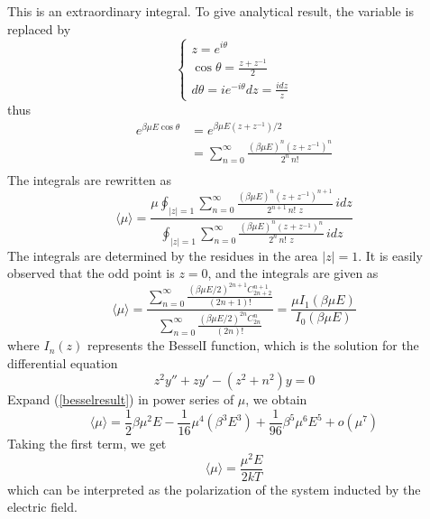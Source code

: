 \documentclass[%
 reprint,
 amsmath,amssymb,
 aps,
10.5pt,
]{revtex4-1}
\begin{document}
 This is an extraordinary integral. To give analytical result, the variable is replaced by
 \begin{equation}
   \begin{cases}
   z = e^{i\theta}\\
   \cos{\theta} = \frac{z+z^{-1}}{2} \\
   d\theta = i e^{-i\theta} dz = \frac{i dz}{z}
   \end{cases}
 \end{equation}
 thus
 \begin{align*}
   e^{\beta \mu E \cos{\theta}} & = e^{\beta \mu E (z + z^{-1})/2} \\
   & = \sum_{n=0}^\infty \frac{(\beta \mu E)^n (z+z^{-1})^{n}}{2^n \, n!} \\
 \end{align*}
 The integrals are rewritten as
 \begin{equation}
   \langle \mu \rangle =  \frac{\mu\oint_{|z|=1} \sum_{n=0}^\infty \frac{( \beta \mu E)^n (z+z^{-1})^{n+1}}{2^{n+1} \, n! \,\, z} \, idz}
   {\oint_{|z|=1} \sum_{n=0}^\infty \frac{( \beta \mu E)^n (z+z^{-1})^{n}}{2^n \, n! \,\, z} \, idz}
 \end{equation}
 The integrals are determined by the residues in the area $|z| = 1$. It is easily observed that the odd point is $z=0$, and the integrals are given as 
 \begin{equation}
   \langle \mu \rangle = \frac{\sum_{n=0}^{\infty} \frac{( \beta \mu E/2)^{2n+1} C_{2n+2}^{n+1}}{(2n+1)!} }{ \sum_{n=0}^{\infty} \frac{( \beta \mu E/2)^{2n} C_{2n}^n}{(2n)!}  } = \frac{\mu I_1(\beta \mu E)}{I_0( \beta \mu E)}
   \label{besselresult}
 \end{equation}
 where $I_n(z)$ represents the BesselI function, which is the solution for the differential equation
 \begin{equation}
   z^2 y'' + z y' - (z^2 + n^2) y = 0
 \end{equation}
 Expand (\ref{besselresult}) in power series of $\mu$, we obtain
 \begin{equation}
\langle \mu \rangle =  \frac{1}{2} \beta  \mu ^2
E-\frac{1}{16} \mu ^4 \left(\beta
^3 E^3\right)+\frac{1}{96} \beta
^5 \mu ^6 E^5+o\left(\mu
^{7}\right)
\end{equation}  
Taking the first term, we get
\begin{equation}
  \langle \mu \rangle = \frac{\mu^2 E}{2 kT}
\end{equation}
which can be interpreted as the polarization of the system inducted by the electric field.
\end{document}
